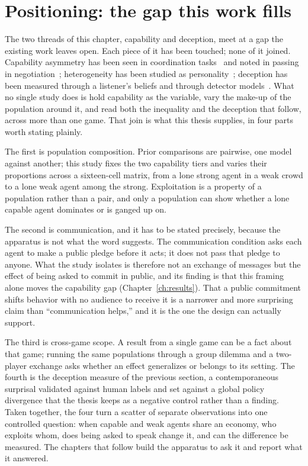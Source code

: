 \section{Positioning: the gap this work fills}
\label{sec:bg-positioning}

The two threads of this chapter, capability and deception, meet at a gap the existing work
leaves open. Each piece of it has been touched; none of it joined. Capability asymmetry has
been seen in coordination tasks~\cite{morecapable2026} and noted in passing in
negotiation~\cite{abdelnabi2023}; heterogeneity has been studied as
personality~\cite{networkgames2026}; deception has been measured through a listener's beliefs
and through detector models~\cite{deceptivedialogue2025, hiddenplaintext2026}. What no single
study does is hold capability as the variable, vary the make-up of the population around it,
and read both the inequality and the deception that follow, across more than one game. That
join is what this thesis supplies, in four parts worth stating plainly.

The first is population composition. Prior comparisons are pairwise, one model against
another; this study fixes the two capability tiers and varies their proportions across a
sixteen-cell matrix, from a lone strong agent in a weak crowd to a lone weak agent among the
strong. Exploitation is a property of a population rather than a pair, and only a population
can show whether a lone capable agent dominates or is ganged up on.

The second is communication, and it has to be stated precisely, because the apparatus is not
what the word suggests. The communication condition asks each agent to make a public pledge
before it acts; it does not pass that pledge to anyone. What the study isolates is therefore
not an exchange of messages but the effect of being asked to commit in public, and its finding
is that this framing alone moves the capability gap (Chapter~\ref{ch:results}). That a public
commitment shifts behavior with no audience to receive it is a narrower and more surprising
claim than ``communication helps,'' and it is the one the design can actually support.

The third is cross-game scope. A result from a single game can be a fact about that game;
running the same populations through a group dilemma and a two-player exchange asks whether an
effect generalizes or belongs to its setting. The fourth is the deception measure of the
previous section, a contemporaneous surprisal validated against human labels and set against a
global policy divergence that the thesis keeps as a negative control rather than a finding.
Taken together, the four turn a scatter of separate observations into one controlled question:
when capable and weak agents share an economy, who exploits whom, does being asked to speak
change it, and can the difference be measured. The chapters that follow build the apparatus to
ask it and report what it answered.
